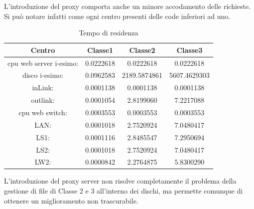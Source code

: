 L'introduzione del proxy comporta anche un minore accodamento delle richieste. Si può notare infatti come ogni centro presenti delle code inferiori ad uno.
\begin{table}[H]
\begin{center}
\begin{tabular}{||c|c|c|c||}
\hline
Centro &Classe1 &Classe2 &Classe3\\
\hline
\hline
 cpu web server i-esimo: 	&0.0222618	&0.0222618	&0.0222618	\\\hline
 disco i-esimo: 	&0.0962583	&2189.5874861	&5607.4629303	\\\hline
 inLink: 	&0.0001138	&0.0001138	&0.0001138	\\\hline
 outlink: 	&0.0001054	&2.8199060	&7.2217088	\\\hline
 cpu web switch: 	&0.0003553	&0.0003553	&0.0003553	\\\hline
 LAN: 	&0.0001018	&2.7520924	&7.0480417	\\\hline
 LS1: 	&0.0001116	&2.8485547	&7.2950694	\\\hline
 LS2: 	&0.0001018	&2.7520924	&7.0480417	\\\hline
 LW2: 	&0.0000842	&2.2764875	&5.8300290	\\\hline
\end{tabular}
\end{center}
\caption{Tempo di residenza}
\label{tempodiresidenza}
\end{table}
L'introduzione del proxy server non risolve completamente il problema della gestione di file di Classe 2 e 3 all'interno dei dischi, ma permette comunque di ottenere un miglioramento non trascurabile.  
